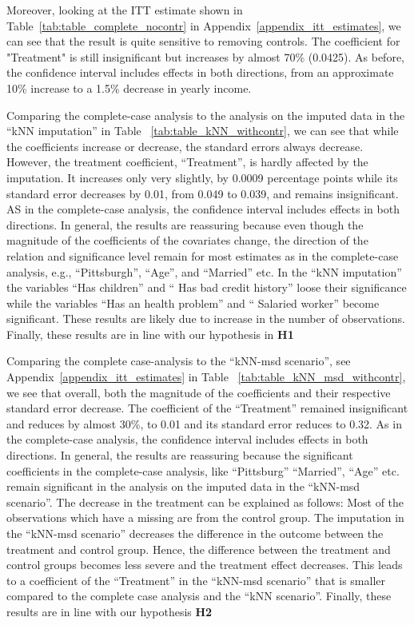Moreover, looking at the ITT estimate shown in Table~\ref{tab:table_complete_nocontr} in Appendix~\ref{appendix_itt_estimates}, we can see that the result is quite sensitive to removing controls. The coefficient for "Treatment" is still insignificant but increases by almost 70\% (0.0425). As before, the confidence interval includes effects in both directions, from an approximate 10\% increase to a 1.5\% decrease in yearly income.

Comparing the complete-case analysis to the analysis on the imputed data in the ``kNN imputation'' in Table ~\ref{tab:table_kNN_withcontr}, we can see that while the coefficients increase or decrease, the standard errors always decrease. However, the treatment coefficient, ``Treatment'', is hardly affected by the imputation. It increases only very slightly, by 0.0009 percentage points while its standard error decreases by 0.01, from 0.049 to 0.039, and remains insignificant. AS in the complete-case analysis, the confidence interval includes effects in both directions. In general, the results are reassuring because even though the magnitude of the coefficients of the covariates change, the direction of the relation and significance level remain for most estimates as in the complete-case analysis, e.g., ``Pittsburgh'', ``Age'', and ``Married'' etc. In the ``kNN imputation'' the variables ``Has children'' and `` Has bad credit history'' loose their significance while the variables ``Has an health problem'' and `` Salaried worker'' become significant. These results are likely due to increase in the number of observations. Finally, these results are in line with our hypothesis in \textbf{H1}

Comparing the complete case-analysis to the ``kNN-msd scenario'', see Appendix~\ref{appendix_itt_estimates} in Table ~\ref{tab:table_kNN_msd_withcontr}, we see that overall, both the magnitude of the coefficients and their respective standard error decrease. The coefficient of the ``Treatment'' remained insignificant and reduces by almost 30\%, to 0.01 and its standard error reduces to 0.32. As in the complete-case analysis, the confidence interval includes effects in both directions. In general, the results are reassuring because the significant coefficients in the complete-case analysis, like ``Pittsburg'' ``Married'', ``Age'' etc. remain significant in the analysis on the imputed data in the ``kNN-msd scenario''. The decrease in the treatment can be explained as follows: Most of the observations which have a missing are from the control group. The imputation in the ``kNN-msd scenario'' decreases the difference in the outcome between the treatment and control group. Hence, the difference between the treatment and control groups becomes less severe and the treatment effect decreases. This leads to a coefficient of the ``Treatment'' in the ``kNN-msd scenario'' that is smaller compared to the complete case analysis and the ``kNN scenario''. Finally, these results are in line with our hypothesis \textbf{H2}

